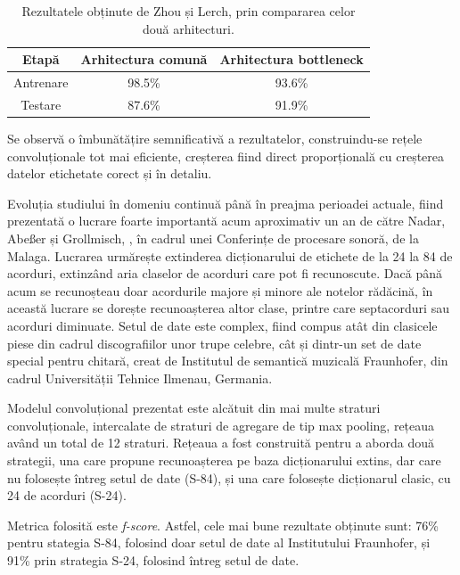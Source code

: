 \documentclass[a4paper,12pt]{report}
\begin{document}
\begin{table}[h!]
    \begin{center}
        \begin{tabular}{ | c | c | c | }
            \hline 
                Etapă &  Arhitectura comună & Arhitectura bottleneck\\
                \hline \hline 
                Antrenare & 98.5\% & 93.6\% \\
                \hline
                Testare & 87.6\% & 91.9\% \\
            \hline
        \end{tabular}
        \caption{Rezultatele obținute de Zhou și Lerch, prin compararea celor două arhitecturi.}
    \end{center}
\end{table}

Se observă o îmbunătățire semnificativă a rezultatelor, construindu-se rețele 
convoluționale tot mai eficiente, creșterea fiind direct proporțională cu
creșterea datelor etichetate corect și în detaliu. 

Evoluția studiului
în domeniu continuă până în preajma perioadei actuale, fiind prezentată o lucrare 
foarte importantă acum aproximativ un an de către 
Nadar, Abeßer și Grollmisch, \cite{Towards-CNN-based-Acoustic-Modeling-of-Seventh-Chords-for-ACR},
în cadrul unei Conferințe de procesare sonoră, de la Malaga. 
Lucrarea urmărește extinderea dicționarului de etichete de la 24 la 84 de acorduri, extinzând
aria claselor de acorduri care pot fi recunoscute. Dacă până acum se recunoșteau doar 
acordurile majore și minore ale notelor rădăcină, în această lucrare se dorește recunoașterea 
altor clase, printre care septacorduri sau acorduri diminuate.
Setul de date este complex, fiind compus atât din clasicele piese din cadrul discografiilor unor 
trupe celebre, cât și dintr-un set de date special pentru chitară, creat de Institutul de semantică
muzicală Fraunhofer, din cadrul Universității Tehnice Ilmenau, Germania. 

Modelul convoluțional prezentat este alcătuit din mai multe straturi convoluționale, intercalate de
straturi de agregare de tip max pooling, rețeaua având un total de 12 straturi. Rețeaua a fost 
construită pentru a aborda două strategii, una care propune recunoașterea pe baza dicționarului 
extins, dar care nu folosește întreg setul de date (S-84), 
și una care folosește dicționarul clasic, cu 24 de acorduri (S-24). 

Metrica folosită este \emph{f-score}. Astfel, cele mai bune rezultate obținute sunt: 76\% pentru stategia 
S-84, folosind doar setul de date al Institutului Fraunhofer, și 91\% prin strategia S-24, folosind întreg setul de date.

\end{document}
